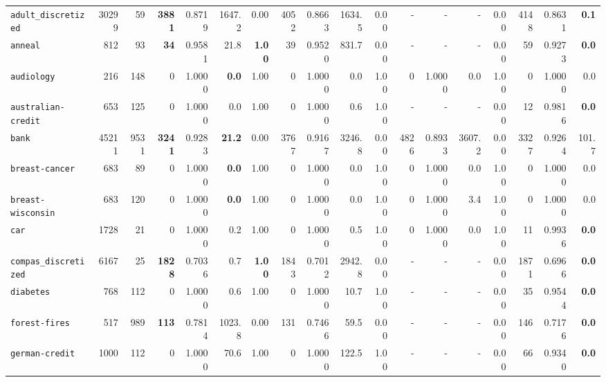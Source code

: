 \begin{tabular}{lccrrrrrrrrrrrrrrr}
\texttt{adult\_discretized} & \multicolumn{1}{r}{30299} & \multicolumn{1}{r}{59}  & \textbf{3881} & 0.8719 & 1647.2 & 0.00 & 4052 & 0.8663 & 1634.5 & 0.00 & - & - & - & 0.00 & 4148 & 0.8631 & \textbf{0.1}\\
\texttt{anneal} & \multicolumn{1}{r}{812} & \multicolumn{1}{r}{93}  & \textbf{34} & 0.9581 & 21.8 & \textbf{1.00} & 39 & 0.9520 & 831.7 & 0.00 & - & - & - & 0.00 & 59 & 0.9273 & \textbf{0.0}\\
\texttt{audiology} & \multicolumn{1}{r}{216} & \multicolumn{1}{r}{148}  & 0 & 1.0000 & \textbf{0.0} & 1.00 & 0 & 1.0000 & 0.0 & 1.00 & 0 & 1.0000 & 0.0 & 1.00 & 0 & 1.0000 & 0.0\\
\texttt{australian-credit} & \multicolumn{1}{r}{653} & \multicolumn{1}{r}{125}  & 0 & 1.0000 & 0.0 & 1.00 & 0 & 1.0000 & 0.6 & 1.00 & - & - & - & 0.00 & 12 & 0.9816 & \textbf{0.0}\\
\texttt{bank} & \multicolumn{1}{r}{45211} & \multicolumn{1}{r}{9531}  & \textbf{3241} & 0.9283 & \textbf{21.2} & 0.00 & 3767 & 0.9167 & 3246.8 & 0.00 & 4826 & 0.8933 & 3607.2 & 0.00 & 3327 & 0.9264 & 101.7\\
\texttt{breast-cancer} & \multicolumn{1}{r}{683} & \multicolumn{1}{r}{89}  & 0 & 1.0000 & \textbf{0.0} & 1.00 & 0 & 1.0000 & 0.0 & 1.00 & 0 & 1.0000 & 0.0 & 1.00 & 0 & 1.0000 & 0.0\\
\texttt{breast-wisconsin} & \multicolumn{1}{r}{683} & \multicolumn{1}{r}{120}  & 0 & 1.0000 & \textbf{0.0} & 1.00 & 0 & 1.0000 & 0.0 & 1.00 & 0 & 1.0000 & 3.4 & 1.00 & 0 & 1.0000 & 0.0\\
\texttt{car} & \multicolumn{1}{r}{1728} & \multicolumn{1}{r}{21}  & 0 & 1.0000 & 0.2 & 1.00 & 0 & 1.0000 & 0.5 & 1.00 & 0 & 1.0000 & 0.0 & 1.00 & 11 & 0.9936 & \textbf{0.0}\\
\texttt{compas\_discretized} & \multicolumn{1}{r}{6167} & \multicolumn{1}{r}{25}  & \textbf{1828} & 0.7036 & 0.7 & \textbf{1.00} & 1843 & 0.7012 & 2942.8 & 0.00 & - & - & - & 0.00 & 1871 & 0.6966 & \textbf{0.0}\\
\texttt{diabetes} & \multicolumn{1}{r}{768} & \multicolumn{1}{r}{112}  & 0 & 1.0000 & 0.6 & 1.00 & 0 & 1.0000 & 10.7 & 1.00 & - & - & - & 0.00 & 35 & 0.9544 & \textbf{0.0}\\
\texttt{forest-fires} & \multicolumn{1}{r}{517} & \multicolumn{1}{r}{989}  & \textbf{113} & 0.7814 & 1023.8 & 0.00 & 131 & 0.7466 & 59.5 & 0.00 & - & - & - & 0.00 & 146 & 0.7176 & \textbf{0.0}\\
\texttt{german-credit} & \multicolumn{1}{r}{1000} & \multicolumn{1}{r}{112}  & 0 & 1.0000 & 70.6 & 1.00 & 0 & 1.0000 & 122.5 & 1.00 & - & - & - & 0.00 & 66 & 0.9340 & \textbf{0.0}\\

\end{tabular}
